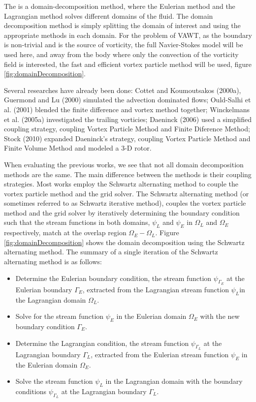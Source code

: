 The  is a domain-decomposition method, where the Eulerian method and the Lagrangian method solves different domains of the fluid. The domain decomposition method is simply splitting the domain of interest and using the appropriate methods in each domain. For the problem of VAWT, as the boundary is non-trivial and is the source of vorticity, the full Navier-Stokes model will be used here, and away from the body where only the convection of the vorticity field is interested, the fast and efficient vortex particle method will be used, figure \ref{fig:domainDecomposition}.

Several researches have already been done: Cottet and Koumoutsakos (2000a)\cite{Cottet2000a}, Guermond and Lu (2000) \cite{Guermond2000} simulated the advection dominated flows; Ould-Salhi et al. (2001) \cite{Ould-Salihi2001} blended the finite difference and vortex method together; Winckelmans et al. (2005a) \cite{Winckelmans2005a} investigated the trailing vorticies; Daeninck (2006) \cite{Daeninck2006} used a simplified coupling strategy, coupling Vortex Particle Method and Finite Diference Method; Stock (2010) \cite{Stock} expanded Daeninck's strategy, coupling Vortex Particle Method and Finite Volume Method and modeled a 3-D rotor.

When evaluating the previous works, we see that not all domain decomposition methods are the same. The main difference between the methods is their coupling strategies. Most works employ the Schwartz alternating method to couple the vortex particle method and the grid solver. The Schwartz alternating method (or sometimes referred to as Schwartz iterative method), couples the vortex particle method and the grid solver by iteratively determining the boundary condition such that the stream functions in both domains, $\psi_L$ and $\psi_E$ in $\Omega_L$ and $\Omega_E$ respectively, match at the overlap region $\Omega_E-\Omega_L$. Figure \ref{fig:domainDecomposition} shows the domain decomposition using the Schwartz alternating method. The summary of a single iteration of the Schwartz alternating method is as follows:
	\begin{itemize}
	\item Determine the Eulerian boundary condition, the stream function $\psi_{\Gamma_E}$ at the Eulerian boundary $\Gamma_E$, extracted from the Lagrangian stream function $\psi_L$in the Lagrangian domain $\Omega_L$.
	\item Solve for the stream function $\psi_E$ in the Eulerian domain $\Omega_E$ with the new boundary condition $\Gamma_E$.
	\item Determine the Lagrangian condition, the stream function $\psi_{\Gamma_L}$ at the Lagrangian boundary $\Gamma_L$, extracted from the Eulerian stream function $\psi_E$ in the Eulerian domain $\Omega_E$.
	\item Solve the stream function $\psi_L$ in the Lagrangian domain with the boundary conditions $\psi_{\Gamma_L}$ at the Lagrangian boundary $\Gamma_L$.
	\end{itemize}
	
